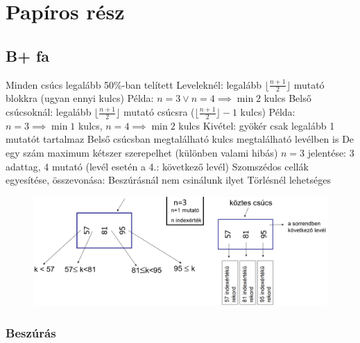 \documentclass[12pt,a4paper]{article}
\begin{document}
\pagebreak

\section{Papíros rész}

\subsection{B+ fa}

\begin{outline}
	\1 Minden csúcs legalább 50\%-ban telített
		\2 Leveleknél: legalább $\lfloor \frac{n+1}{2} \rfloor$ mutató blokkra (ugyan ennyi kulcs)
			\3 Példa: $n=3 \lor n=4 \implies \min 2$ kulcs
		\2 Belső csúcsoknál: legalább $\lfloor \frac{n+1}{2} \rfloor$ mutató csúcsra ($\lfloor \frac{n+1}{2} \rfloor - 1$ kulcs)
			\3 Példa: $n=3 \implies \min 1$ kulcs, $n=4 \implies \min 2$ kulcs
		\2 Kivétel: gyökér csak legalább 1 mutatót tartalmaz
	\1 Belső csúcsban megtalálható kulcs megtalálható levélben is
		\2 De egy szám maximum kétszer szerepelhet (különben valami hibás)
	\1 $n=3$ jelentése: 3 adattag, 4 mutató (levél esetén a 4.: következő levél)
	\1 Szomszédos cellák egyesítése, összevonása:
		\2 Beszúrásnál nem csinálunk ilyet
		\2 Törlésnél lehetséges
\end{outline}

\begin{figure}[h!]
	\centering
	\includegraphics[width=0.9\linewidth]{"b+ alapok"}
\end{figure}

\pagebreak

\subsubsection{Beszúrás}
\end{document}
